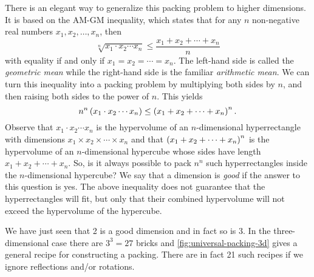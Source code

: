 There is an elegant way to generalize this packing problem to higher dimensions. It is based on the AM-GM inequality, which states that for any $n$ non-negative real numbers $x_1, x_2, \dotsc, x_n$, then
\begin{equation}\label{eq:am-gm-ineq}
\sqrt[n]{x_1 \cdot x_2 \dotsm x_n} \leq \frac{x_1 + x_2 + \dotsb + x_n}{n}
\end{equation}
with equality if and only if $x_1 = x_2 = \dotsb = x_n$. The left-hand side is called the \textit{geometric mean} while the right-hand side is the familiar \textit{arithmetic mean}. We can turn this inequality into a packing problem by multiplying both sides by $n$, and then raising both sides to the power of $n$. This yields
\[
n^n \left( x_1 \cdot x_2 \dotsm x_n \right) \leq \left( x_1 + x_2 + \dotsb + x_n \right)^n.
\]
Observe that $x_1 \cdot x_2 \dotsm x_n$ is the hypervolume of an $n$-dimensional hyperrectangle with dimensions $x_1 \times x_2 \times \dotsb \times x_n$ and that $\left( x_1 + x_2 + \dotsb + x_n \right)^n$ is the hypervolume of an $n$-dimensional hypercube whose sides have length $x_1 + x_2 + \dotsb + x_n$. So, is it always possible to pack $n^n$ such hyperrectangles inside the $n$-dimensional hypercube? We say that a dimension is \textit{good} if the answer to this question is yes. The above inequality does not guarantee that the hyperrectangles will fit, but only that their combined hypervolume will not exceed the hypervolume of the hypercube.

We have just seen that 2 is a good dimension and in fact so is 3. In the three-dimensional case there are $3^3 = 27$ bricks and \cref{fig:universal-packing-3d} gives a general recipe for constructing a packing. There are in fact 21 such recipes if we ignore reflections and/or rotations.

